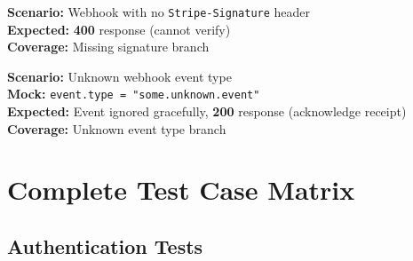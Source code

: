 \documentclass[12pt,a4paper]{report}
\newcommand{\pone}{\textbf{\color{p1red}P1}}
\newcommand{\ptwo}{\textbf{\color{p2orange}P2}}
\begin{document}
\begin{tcolorbox}[criticalbox, title={PAY-002 \hfill \pone\ --- Missing Signature}]
\textbf{Scenario:} Webhook with no \texttt{Stripe-Signature} header \\
\textbf{Expected:} \textbf{400} response (cannot verify) \\
\textbf{Coverage:} Missing signature branch
\end{tcolorbox}

\begin{tcolorbox}[testbox, title={PAY-005 \hfill \ptwo}]
\textbf{Scenario:} Unknown webhook event type \\
\textbf{Mock:} \texttt{event.type = "some.unknown.event"} \\
\textbf{Expected:} Event ignored gracefully, \textbf{200} response (acknowledge receipt) \\
\textbf{Coverage:} Unknown event type branch
\end{tcolorbox}



\chapter{Complete Test Case Matrix}

\section{Authentication Tests}
\end{document}
